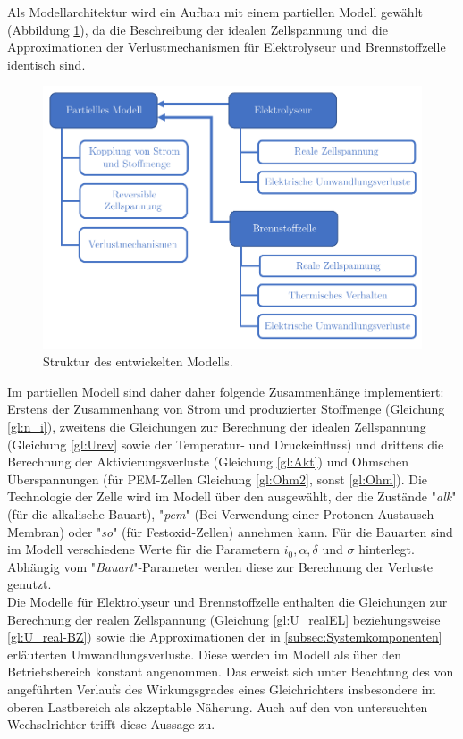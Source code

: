 Als Modellarchitektur wird ein Aufbau mit einem partiellen Modell gewählt (Abbildung \ref{fig:Modellstruktur}), da die Beschreibung der idealen Zellspannung und die Approximationen der Verlustmechanismen für Elektrolyseur und Brennstoffzelle identisch sind. \begin{figure}[h]
	\centering
		\includegraphics[scale=1]{Figures/Modellstruktur}
		\caption{Struktur des entwickelten Modells.}
\label{fig:Modellstruktur}	
\end{figure}
Im partiellen Modell sind daher daher folgende Zusammenhänge implementiert: Erstens der Zusammenhang von Strom und produzierter Stoffmenge (Gleichung \ref{gl:n_i}), zweitens die Gleichungen zur Berechnung der idealen Zellspannung (Gleichung \ref{gl:Urev} sowie der Temperatur- und Druckeinfluss) und drittens die Berechnung der Aktivierungsverluste  (Gleichung  \ref{gl:Akt}) und Ohmschen Überspannungen (für PEM-Zellen Gleichung \ref{gl:Ohm2}, sonst \ref{gl:Ohm}). Die Technologie der Zelle wird im Modell über den  ausgewählt, der die Zustände "\textit{alk}" (für die alkalische Bauart), "\textit{pem}" (Bei Verwendung einer Protonen Austausch Membran) oder "\textit{so}" (für Festoxid-Zellen) annehmen kann.
Für die Bauarten sind im Modell verschiedene Werte für die Parametern $i_0, \alpha, \delta$ und $\sigma$ hinterlegt. Abhängig vom "\textit{Bauart}"-Parameter werden diese zur Berechnung der Verluste genutzt.\\

Die Modelle für Elektrolyseur und Brennstoffzelle enthalten die Gleichungen zur Berechnung der realen Zellspannung (Gleichung \ref{gl:U_realEL} beziehungsweise \ref{gl:U_real-BZ}) sowie die Approximationen der in \ref{subsec:Systemkomponenten} erläuterten Umwandlungsverluste. Diese werden im Modell als über den Betriebsbereich konstant angenommen. Das erweist sich unter Beachtung des von \citet[S.~50]{tjarks_pem-elektrolyse-systeme_2017} angeführten Verlaufs des Wirkungsgrades eines Gleichrichters insbesondere im oberen Lastbereich als akzeptable Näherung. Auch auf den von \citet{trubitsyn_high-efficiency_2010} untersuchten Wechselrichter trifft diese Aussage zu.\\

